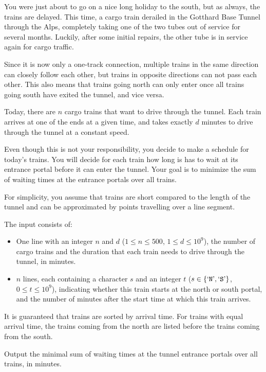 

\newcommand{\maxn}{500}
\newcommand{\maxd}{10^9}
\newcommand{\maxt}{10^9}

You were just about to go on a nice long holiday to the south, but as always, the trains are delayed.
This time, a cargo train derailed in the Gotthard Base Tunnel through the Alps, completely taking
one of the two tubes out of service for several months. Luckily, after some
initial repairs, the other tube is in service again for cargo traffic.

Since it is now only a one-track connection, multiple trains in the same direction
can closely follow each other, but trains in opposite directions can not pass
each other. This also means that trains going north can only enter once all
trains going south have exited the tunnel, and vice versa.

Today, there are \(n\) cargo trains that want to drive through the tunnel.
Each train arrives at one of the ends at a given time,
and takes exactly \(d\) minutes to drive through the tunnel at a constant speed.

Even though this is not your responsibility, you decide to make a schedule for
today's trains.
You will decide for each train how long is has to wait at its entrance portal
before it can enter the tunnel. Your goal is to minimize the sum of waiting times
at the entrance portals over all trains.

For simplicity, you assume that trains are short compared to the length of the
tunnel and can be approximated by points travelling over a line segment.


\begin{Input}
    The input consists of:
    \begin{itemize}
        \item One line with an integer \(n\) and \(d\) (\(1\leq n\leq \maxn\), \(1 \leq d \leq \maxd\)),
            the number of cargo trains and the duration that each train needs to drive through the tunnel, in minutes.
        \item \(n\) lines, each containing a character \(s\) and an integer \(t\)
    (\(s \in \{\text{`\texttt{N}'},\text{`\texttt{S}'}\}\), \(0 \leq
    t \leq \maxt\)), indicating whether this train starts at the north or south
    portal, and the number of minutes after the start time at which this
    train arrives.
    \end{itemize}
    It is guaranteed that trains are sorted by arrival time.
    For trains with equal arrival time,
    the trains coming from the north are listed before the trains coming from the south.
\end{Input}

\begin{Output}
    Output the minimal sum of waiting times at the tunnel entrance portals over all trains, in minutes.
\end{Output}
